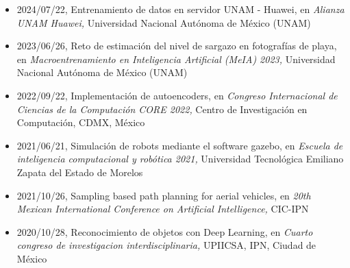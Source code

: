 \begin{itemize} 
\item 2024/07/22, Entrenamiento de datos en servidor UNAM - Huawei, en \textit{ Alianza UNAM Huawei,} Universidad Nacional Autónoma de México (UNAM) 
\item 2023/06/26, Reto de estimación del nivel de sargazo en fotografías de playa, en \textit{ Macroentrenamiento en Inteligencia Artificial (MeIA) 2023,} Universidad Nacional Autónoma de México (UNAM) 
\item 2022/09/22, Implementación de autoencoders, en \textit{ Congreso Internacional de Ciencias de la Computación CORE 2022,} Centro de Investigación en Computación, CDMX, México 
\item 2021/06/21, Simulación de robots mediante el software gazebo, en \textit{ Escuela de inteligencia computacional y robótica 2021,} Universidad Tecnológica Emiliano Zapata del Estado de Morelos 
\item 2021/10/26, Sampling based path planning for aerial vehicles, en \textit{ 20th Mexican International Conference on Artificial Intelligence,} CIC-IPN 
\item 2020/10/28, Reconocimiento de objetos con Deep Learning, en \textit{ Cuarto congreso de investigacion interdisciplinaria,} UPIICSA, IPN, Ciudad de México 
\end{itemize} 

